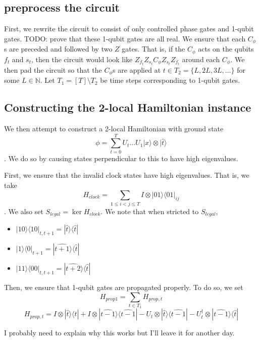 \documentclass{article}
\theoremstyle{definition}
\begin{document}
\subsection{preprocess the circuit}

First, we rewrite the circuit to consist of only controlled phase gates and 1-qubit gates. TODO: prove that these 1-qubit gates are all real. We ensure that each $C_\phi$s are preceded and followed by two $Z$ gates. That is, if the $C_\phi$ acts on the qubits $f_t$ and $s_t$, then the circuit would look like $Z_{f_t}Z_{s_t}C_\phi Z_{s_t}Z_{f_t}$ around each $C_\phi$. We then pad the circuit so that the $C_\phi$s are applied at $t\in T_2=\{L, 2L, 3L, \ldots\}$ for some $L\in\mathbb{N}$. Let $T_1=[T]\setminus T_2$ be time steps corresponding to 1-qubit gates.

\subsection{Constructing the 2-local Hamiltonian instance}

We then attempt to construct a 2-local Hamiltonian with ground state $$\phi=\sum_{t=0}^TU_t...U_1|x\rangle\otimes|\hat{t}\rangle$$. We do so by causing states perpendicular to this to have high eigenvalues.

First, we ensure that the invalid clock states have high eigenvalues. That is, we take $$H_{clock}=\sum_{1\leq i<j\leq T} I\otimes |01\rangle\langle01|_{ij}$$. We also set $S_{legal}=\ker H_{clock}$.
We note that when stricted to $S_{legal}$, 
\begin{itemize}
	\item $|10\rangle\langle10|_{t,t+1}
		=|\widehat{t}\rangle\langle\widehat{t}|$ 
	\item $|1\rangle\langle0|_{t+1}
		=|\widehat{t+1}\rangle\langle\widehat{t}|$
	\item $|11\rangle\langle00|_{t,t+1}
		=|\widehat{t+2}\rangle\langle\widehat{t}|$
\end{itemize}

Then, we ensure that 1-qubit gates are propagated properly. To do so, we set
	$$H_{prop1}=\sum_{t\in T_1}H_{prop,t}$$
	$$H_{prop,t}=I\otimes|\widehat{t}\rangle\langle\widehat{t}|
		+I\otimes|\widehat{t-1}\rangle\langle\widehat{t-1}|
		-U_t\otimes|\widehat{t}\rangle\langle\widehat{t-1}|
		-U_t^\dagger\otimes|\widehat{t-1}\rangle\langle\widehat{t}|$$

I probably need to explain why this works but I'll leave it for another day.
\end{document}
